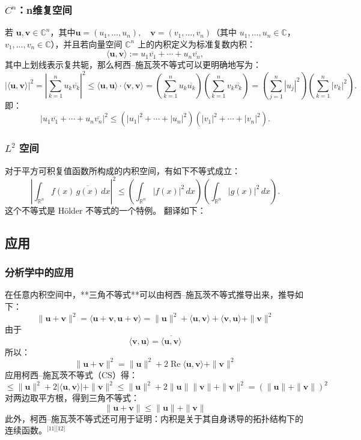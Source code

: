 \subsubsection{$C^n$：n维复空间}
若 $\mathbf{u}, \mathbf{v} \in \mathbb{C}^n$，其中$\mathbf{u} = (u_1, \ldots, u_n), \quad \mathbf{v} = (v_1, \ldots, v_n)$（其中 $u_1, \ldots, u_n \in \mathbb{C}$，$v_1, \ldots, v_n \in \mathbb{C}$），并且若向量空间 $\mathbb{C}^n$ 上的内积定义为标准复数内积：
$$
\langle \mathbf{u}, \mathbf{v} \rangle := u_1 \overline{v_1} + \cdots + u_n \overline{v_n},~
$$
其中上划线表示复共轭，那么柯西–施瓦茨不等式可以更明确地写为：
$$
\left| \langle \mathbf{u}, \mathbf{v} \rangle \right|^2 = \left| \sum_{k=1}^n u_k \overline{v_k} \right|^2 \leq \langle \mathbf{u}, \mathbf{u} \rangle \cdot \langle \mathbf{v}, \mathbf{v} \rangle = \left( \sum_{k=1}^n u_k \overline{u_k} \right) \left( \sum_{k=1}^n v_k \overline{v_k} \right) = \left( \sum_{j=1}^n |u_j|^2 \right) \left( \sum_{k=1}^n |v_k|^2 \right).~
$$
即：
$$
\left| u_1 \overline{v_1} + \cdots + u_n \overline{v_n} \right|^2 \leq \left( |u_1|^2 + \cdots + |u_n|^2 \right) \left( |v_1|^2 + \cdots + |v_n|^2 \right).~
$$
\subsubsection{$L^2$ 空间}
对于平方可积复值函数所构成的内积空间，有如下不等式成立：
$$
\left| \int_{\mathbb{R}^n} f(x)\, \overline{g(x)}\, dx \right|^2 \leq \left( \int_{\mathbb{R}^n} |f(x)|^2\, dx \right) \left( \int_{\mathbb{R}^n} |g(x)|^2\, dx \right).~
$$
这个不等式是 Hölder 不等式的一个特例。
翻译如下：
\subsection{应用}
\subsubsection{分析学中的应用}
在任意内积空间中，**三角不等式**可以由柯西–施瓦茨不等式推导出来，推导如下：
$$
\|\mathbf{u} + \mathbf{v} \|^2 = \langle \mathbf{u} + \mathbf{v}, \mathbf{u} + \mathbf{v} \rangle
= \|\mathbf{u}\|^2 + \langle \mathbf{u}, \mathbf{v} \rangle + \langle \mathbf{v}, \mathbf{u} \rangle + \|\mathbf{v}\|^2~
$$
由于
$$
\langle \mathbf{v}, \mathbf{u} \rangle = \overline{\langle \mathbf{u}, \mathbf{v} \rangle}~
$$
所以：
$$
\|\mathbf{u} + \mathbf{v} \|^2 = \|\mathbf{u}\|^2 + 2\operatorname{Re} \langle \mathbf{u}, \mathbf{v} \rangle + \|\mathbf{v}\|^2~
$$
应用柯西–施瓦茨不等式（CS）得：
$$
\leq \|\mathbf{u}\|^2 + 2|\langle \mathbf{u}, \mathbf{v} \rangle| + \|\mathbf{v}\|^2 
\leq \|\mathbf{u}\|^2 + 2\|\mathbf{u}\|\|\mathbf{v}\| + \|\mathbf{v}\|^2 
= (\|\mathbf{u}\| + \|\mathbf{v}\|)^2~
$$
对两边取平方根，得到三角不等式：
$$
\|\mathbf{u} + \mathbf{v} \| \leq \|\mathbf{u} \| + \|\mathbf{v} \|~
$$
此外，柯西–施瓦茨不等式还可用于证明：内积是关于其自身诱导的拓扑结构下的连续函数。\(^\text{[11][12]}\)
